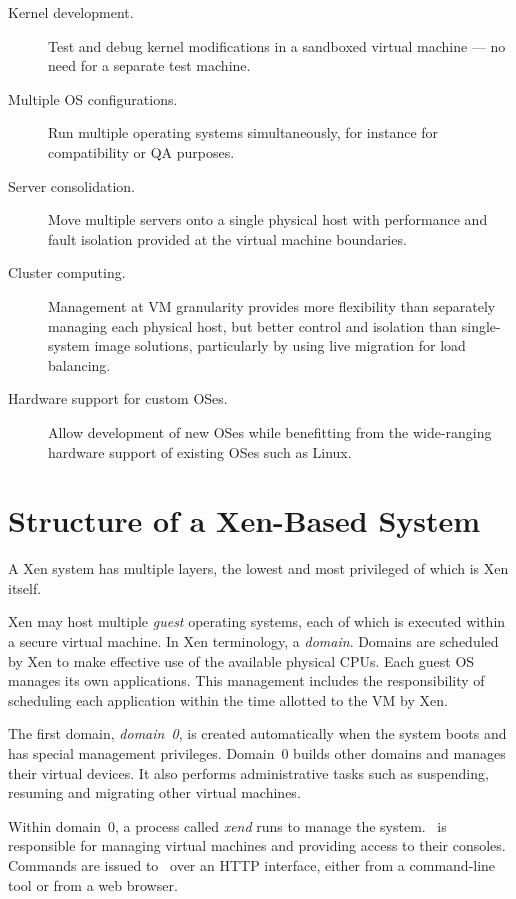 \begin{description}
\item [Kernel development.] Test and debug kernel modifications in a
  sandboxed virtual machine --- no need for a separate test machine.
\item [Multiple OS configurations.] Run multiple operating systems
  simultaneously, for instance for compatibility or QA purposes.
\item [Server consolidation.] Move multiple servers onto a single
  physical host with performance and fault isolation provided at the
  virtual machine boundaries.
\item [Cluster computing.] Management at VM granularity provides more
  flexibility than separately managing each physical host, but better
  control and isolation than single-system image solutions,
  particularly by using live migration for load balancing.
\item [Hardware support for custom OSes.] Allow development of new
  OSes while benefitting from the wide-ranging hardware support of
  existing OSes such as Linux.
\end{description}


\section{Structure of a Xen-Based System}

A Xen system has multiple layers, the lowest and most privileged of
which is Xen itself.

Xen may host multiple \emph{guest} operating systems, each of which is
executed within a secure virtual machine. In Xen terminology, a
\emph{domain}. Domains are scheduled by Xen to make effective use of
the available physical CPUs.  Each guest OS manages its own
applications. This management includes the responsibility of
scheduling each application within the time allotted to the VM by Xen.

The first domain, \emph{domain~0}, is created automatically when the
system boots and has special management privileges. Domain~0 builds
other domains and manages their virtual devices. It also performs
administrative tasks such as suspending, resuming and migrating other
virtual machines.

Within domain~0, a process called \emph{xend} runs to manage the
system.  \Xend\ is responsible for managing virtual machines and
providing access to their consoles.  Commands are issued to \xend\ 
over an HTTP interface, either from a command-line tool or from a web
browser.


